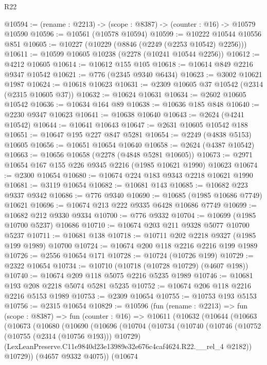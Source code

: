 \begin{lexlean}{R22}
\begin{coremodule}
@10594 := (rename : @2213) -> (scope : @8387) -> (counter : @16) -> @10579 @10590
@10596 := @10561 (@10578 @10594)
@10599 := @10222 @10544 @10556 @851
@10605 := @10227 (@10229 (@8846 (@2249 (@2253 @10542) @2256)))
@10611 := @10599 @10605 @10238 (@2278 (@10241 @10544 @2256))
@10612 := @4212 @10605
@10614 := @10612 @155 @105
@10618 := @10614 @849 @2216 @9347 @10542
@10621 := @776 (@2345 @9340 @6434)
@10623 := @3002 @10621 @1987
@10624 := @10618 @10623
@10631 := @2309 @10605 @37 @10542 (@2314 (@2315 @10605 @37))
@10632 := @10624 @10631
@10634 := @2602 @10605 @10542
@10636 := @10634 @164 @89
@10638 := @10636 @185 @848
@10640 := @2230 @9347 @10623
@10641 := @10638 @10640
@10643 := @2624 (@4241 @10542)
@10644 := @10641 @10643
@10647 := @2631 @10605 @10542 @188
@10651 := @10647 @195 @227 @847 @5281
@10654 := @2249 (@4838 @5153) @10605
@10656 := @10651 @10654 @10640
@10658 := @2624 (@4387 @10542)
@10663 := @10656 @10658 (@2278 (@4848 @5281 @10605))
@10673 := @2971 @10654 @167 @155 @226 @9345 @2216 (@1985 @10621 @1990) @10623
@10674 := @2300 @10654
@10680 := @10674 @224 @183 @9343 @2218 @10621 @1990
@10681 := @3119 @10654
@10682 := @10681 @143
@10685 := @10682 @223 @9337 @9342
@10686 := @776 @9340
@10690 := @10685 (@1985 @10686 @7749) @10621
@10696 := @10674 @213 @222 @9335 @6428 @10686 @7749
@10699 := @10682 @212 @9330 @9334
@10700 := @776 @9332
@10704 := @10699 (@1985 @10700 @5237) @10686
@10710 := @10674 @203 @211 @9328 @5077 @10700 @5237
@10711 := @10681 @138
@10718 := @10711 @202 @2218 @9327 (@1985 @199 @1989) @10700
@10724 := @10674 @200 @118 @2216 @2216 @199 @1989
@10726 := @2556 @10654 @171
@10728 := @10724 (@10726 @199)
@10729 := @2322 @10654
@10734 := @10710 (@10718 (@10728 @10729) (@4607 @198))
@10740 := @10674 @209 @118 @5075 @2216 @5235 @1989
@10746 := @10681 @193 @208 @2218 @5074 @5281 @5235
@10752 := @10674 @206 @118 @2216 @2216 @5153 @1989
@10753 := @2309 @10654
@10755 := @10753 @193 @5153
@10756 := @2315 @10654
@10829 := @10596
    (fun (rename : @2213) =>
    fun (scope : @8387) =>
    fun (counter : @16) =>
    @10611
      (@10632
        (@10644
          (@10663
            (@10673
              (@10680
                (@10690
                  (@10696
                    (@10704
                      (@10734
                        (@10740
                          (@10746
                            (@10752 (@10755 (@2314 (@10756 @193))) @10729)
                            (LexLeanPreserve.C11e9840d23e13989e32e676c4caf4624.R22.__rel_4 @2182))
                          @10729))
                      (@4657 @9332 @4075))
                    (@10674

\end{coremodule}
\end{lexlean}
